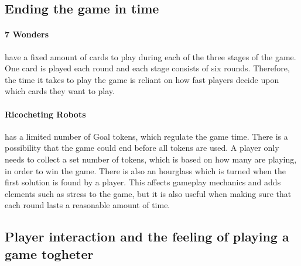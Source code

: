 \documentclass[a4paper]{article}
\begin{document}
\subsection{Ending the game in time}
\paragraph{7 Wonders} have a fixed amount of cards to play during each of the three stages of the game. One card is played each round and each stage consists of six rounds. Therefore, the time it takes to play the game is reliant on how fast players decide upon which cards they want to play.


\paragraph{Ricocheting Robots} has a limited number of Goal tokens, which regulate the game time. There is a possibility that the game could end before all tokens are used. A player only needs to collect a set number of tokens, which is based on how many are playing, in order to win the game. There is also an hourglass which is turned when the first solution is found by a player. This affects gameplay mechanics and adds elements such as stress to the game, but it is also useful when making sure that each round lasts a reasonable amount of time. 

\subsection{Player interaction and the feeling of playing a game togheter}
\end{document}
